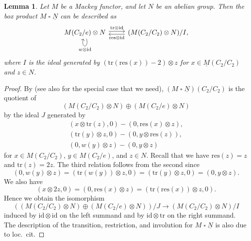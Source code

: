 \documentclass[10pt]{amsart}
\newtheorem{lem}[thm]{Lemma}
\theoremstyle{definition}
\numberwithin{equation}{section}
\newcommand{\ul}{\underline}
\newcommand{\id}{\mathrm{id}}
\DeclareMathOperator{\sotimes}{\square}
\newcommand{\tr}{\mathrm{tr}}
\newcommand{\res}{\mathrm{res}}
\begin{document}
\begin{lem}
\label{lem:box product}
Let $M$ be a Mackey functor,
and let $N$ be an abelian group.
Then the box product $M\sotimes \ul{N}$ can be described as
\[
\begin{tikzcd}
M(C_2/e)\otimes N\ar[loop below,"w\otimes \id"]\ar[r,shift left=0.5ex,"\tr \otimes \id"]\ar[r,shift right=0.5ex,leftarrow,"\res \otimes \id"']&
(M(C_2/C_2)\otimes N
)/I,
\end{tikzcd}
\]
where $I$ is the ideal generated by
$(\tr(\res(x))-2)\otimes z$
for $x\in \ul{M}(C_2/C_2)$ and $z\in N
$.
\end{lem}
\begin{proof}
By \cite[Proposition 1.5.1]{Bouc} (see also \cite[Lemma 2.46]{Shulman} for the special case that we need),
$(M\sotimes \ul{N})(C_2/C_2)$ is the quotient of
\[
(M(C_2/C_2)\otimes N)\oplus (M(C_2/e)\otimes N)
\]
by the ideal $J$ generated by
\begin{gather*}
(x\otimes \tr(z),0)-(0,\res(x)\otimes z),
\\
(\tr(y)\otimes z,0)-(0,y\otimes \res(z)),
\\
(0,w(y) \otimes z)- (0,y \otimes z)
\end{gather*}
for $x\in M(C_2/C_2)$, $y\in M(C_2/e)$, and $z\in N$.
Recall that we have $\res(z)=z$ and $\tr(z)=2z$.
The third relation follows from the second since
\[
(0,w(y)\otimes z)
=
(\tr(w(y))\otimes z,0)
=
(\tr(y)\otimes z,0)
=
(0,y\otimes z).
\]
We also have
\[
(x\otimes 2z,0)=(0,\res(x)\otimes z)=(\tr(\res(x))\otimes z,0).
\]
Hence we obtain the isomorphism
\[
((M(C_2/C_2)\otimes N)\oplus (M(C_2/e)\otimes N))/J
\to
(M(C_2/C_2)\otimes N)/I
\]
induced by $\id \otimes \id$ on the left summand and by $\id\otimes \tr$ on the right summand.
The description of the transition, restriction, and involution for $M\sotimes \ul{N}$ is also due to loc.\ cit.
\end{proof}
\end{document}
